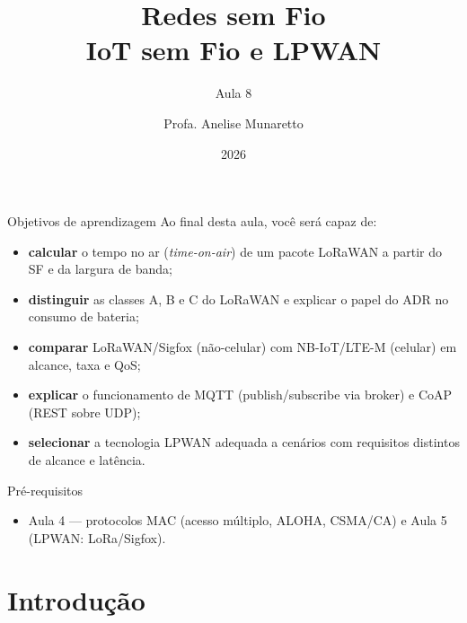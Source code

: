 \documentclass[aspectratio=169,11pt]{beamer}
\title[Redes sem Fio]{Redes sem Fio\\ IoT sem Fio e LPWAN}
\subtitle{Aula 8}
\author[Anelise Munaretto]{Profa. Anelise Munaretto}
\institute[Curso]{Redes sem Fio --- Ciência da Computação}
\date{2026}
\begin{document}
\begin{frame}[plain]
  \titlepage
\end{frame}

\begin{frame}{Objetivos de aprendizagem}
  Ao final desta aula, você será capaz de:
  \begin{itemize}
    \item \textbf{calcular} o tempo no ar (\emph{time-on-air}) de um pacote LoRaWAN a partir do SF e da largura de banda;
    \item \textbf{distinguir} as classes A, B e C do LoRaWAN e explicar o papel do ADR no consumo de bateria;
    \item \textbf{comparar} LoRaWAN/Sigfox (não-celular) com NB-IoT/LTE-M (celular) em alcance, taxa e QoS;
    \item \textbf{explicar} o funcionamento de MQTT (publish/subscribe via broker) e CoAP (REST sobre UDP);
    \item \textbf{selecionar} a tecnologia LPWAN adequada a cenários com requisitos distintos de alcance e latência.
  \end{itemize}
  \begin{alertblock}{Pré-requisitos}
    \begin{itemize}
      \item Aula 4 --- protocolos MAC (acesso múltiplo, ALOHA, CSMA/CA) e Aula 5 (LPWAN: LoRa/Sigfox).
    \end{itemize}
  \end{alertblock}
\end{frame}

\section{Introdução}
\end{document}
